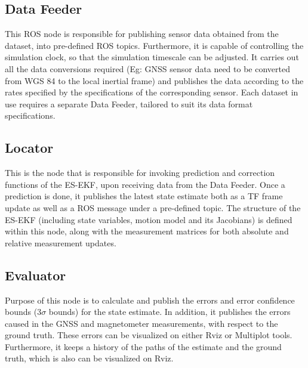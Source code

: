 \subsection{Data Feeder}
This \gls{ROS} node is responsible for publishing sensor data obtained from the dataset, into pre-defined \gls{ROS} topics. Furthermore, it is capable of controlling the simulation clock, so that the simulation timescale can be adjusted. It carries out all the data conversions required (Eg: \gls{GNSS} sensor data need to be converted from \gls{WGS} 84 to the local inertial frame) and publishes the data according to the rates specified by the specifications of the corresponding sensor. Each dataset in use requires a separate Data Feeder, tailored to suit its data format specifications.

\subsection{Locator}
This is the node that is responsible for invoking prediction and correction functions of the \gls{ES-EKF}, upon receiving data from the Data Feeder. Once a prediction is done, it publishes the latest state estimate both as a TF frame update as well as a \gls{ROS} message under a pre-defined topic. The structure of the \gls{ES-EKF} (including state variables, motion model and its Jacobians) is defined within this node, along with the measurement matrices for both absolute and relative measurement updates.

\subsection{Evaluator}
Purpose of this node is to calculate and publish the errors and error confidence bounds (3$\sigma$ bounds) for the state estimate. In addition, it publishes the errors caused in the \gls{GNSS} and magnetometer measurements, with respect to the ground truth. These errors can be visualized on either Rviz or Multiplot tools. Furthermore, it keeps a history of the paths of the estimate and the ground truth, which is also can be visualized on Rviz.



